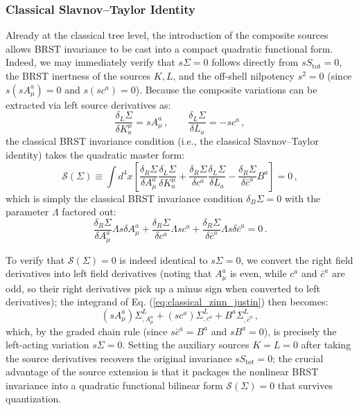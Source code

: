 \subsubsection{Classical Slavnov--Taylor Identity}

Already at the classical tree level, the introduction of the composite sources allows BRST invariance to be cast into a compact quadratic functional form. Indeed, we may immediately verify that \(s\Sigma = 0\) follows directly from \(sS_{\text{tot}} = 0\), the BRST inertness of the sources \(K, L\), and the off-shell nilpotency \(s^2 = 0\) (since \(s(sA_\mu^a) = 0\) and \(s(sc^a) = 0\)). Because the composite variations can be extracted via left source derivatives as:
\begin{equation} \label{eq:brst_source_derivatives}
    \frac{\delta_L \Sigma}{\delta K_a^\mu} = sA_\mu^a \, , \qquad \frac{\delta_L \Sigma}{\delta L_a} = -sc^a \, ,
\end{equation}
the classical BRST invariance condition (i.e., the classical Slavnov--Taylor identity) takes the quadratic master form:
\begin{equation} \label{eq:classical_zinn_justin}
    \mathcal{S}(\Sigma) \equiv \int d^4x \left[ \frac{\delta_R \Sigma}{\delta A_\mu^a} \frac{\delta_L \Sigma}{\delta K_a^\mu} + \frac{\delta_R \Sigma}{\delta c^a} \frac{\delta_L \Sigma}{\delta L_a} - \frac{\delta_R \Sigma}{\delta \bar{c}^a} B^a \right] = 0 \, ,
\end{equation}
which is simply the classical BRST invariance condition \(\delta_B \Sigma = 0\) with the parameter \(\Lambda\) factored out:
\[
    \frac{\delta_R \Sigma}{\delta A_\mu^a} \Lambda s \delta A_\mu^a + \frac{\delta_R \Sigma}{\delta c^a} \Lambda s c^a + \frac{\delta_R \Sigma}{\delta \bar{c}^a} \Lambda s \delta \bar{c}^a = 0 \, .
\]

To verify that \(\mathcal{S}(\Sigma) = 0\) is indeed identical to \(s\Sigma = 0\), we convert the right field derivatives into left field derivatives (noting that \(A_\mu^a\) is even, while \(c^a\) and \(\bar{c}^a\) are odd, so their right derivatives pick up a minus sign when converted to left derivatives); the integrand of Eq. (\ref{eq:classical_zinn_justin}) then becomes:
\begin{equation} \label{eq:integrand_left_derivatives}
    (sA_\mu^a) \Sigma^L_{, A_\mu^a} + (sc^a) \Sigma^L_{, c^a} + B^a \Sigma^L_{, \bar{c}^a} \, ,
\end{equation}
which, by the graded chain rule (since \(s\bar{c}^a = B^a\) and \(sB^a = 0\)), is precisely the left-acting variation \(s\Sigma = 0\). Setting the auxiliary sources \(K = L = 0\) after taking the source derivatives recovers the original invariance \(sS_{\text{tot}} = 0\); the crucial advantage of the source extension is that it packages the nonlinear BRST invariance into a quadratic functional bilinear form \(\mathcal{S}(\Sigma) = 0\) that survives quantization.

